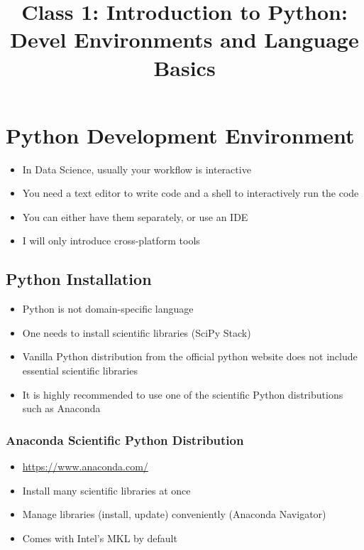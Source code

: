 \documentclass[10pt,article]{article}
\date{\vspace{-6ex}}
\title{Class 1: Introduction to Python: Devel Environments and Language Basics}
\begin{document}
\maketitle
{} 
\thispagestyle{fancy}

\setcounter{tocdepth}{1}
\tableofcontents
\vspace{6ex}

\section{Python Development Environment}
\label{sec:org00fe63a}
\begin{itemize}
\item In Data Science, usually your workflow is interactive
\item You need a text editor to write code and a shell to interactively run the
code
\item You can either have them separately, or use an IDE
\item I will only introduce cross-platform tools
\end{itemize}
\subsection{Python Installation}
\label{sec:org3b6026b}
\begin{itemize}
\item Python is not domain-specific language

\item One needs to install scientific libraries (SciPy Stack)
\end{itemize}

\begin{itemize}
\item Vanilla Python distribution from the official python website does not include
essential scientific libraries

\item It is highly recommended to use one of the scientific Python distributions
such as Anaconda
\end{itemize}

\subsubsection{Anaconda Scientific Python Distribution}
\label{sec:org676e46e}
\begin{itemize}
\item \url{https://www.anaconda.com/}
\item Install many scientific libraries at once
\item Manage libraries (install, update) conveniently (Anaconda Navigator)
\item Comes with Intel's MKL by default
\end{itemize}
\end{document}
